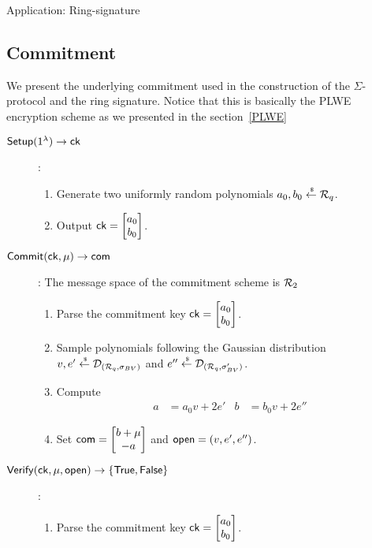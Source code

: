 \begin{section}{Application: Ring-signature}
  \subsection{Commitment}
  We present the underlying commitment used in the construction of the $\Sigma$-protocol
  and the ring signature.
  Notice that this is basically the PLWE encryption scheme as we presented in the section~\ref{PLWE}
  \begin{description}
    \item [${\mathsf{Setup}}(1^\lambda) \to \mathsf{ck}$]:
    \begin{enumerate}
      \item Generate two uniformly random polynomials $a_0, b_0 \stackrel{{\scriptscriptstyle \mkern4mu \$}}{\gets} {\mathcal{R}}_q$.
      \item Output $\mathsf{ck} = \begin{bmatrix} a_0 \\ b_0 \end{bmatrix}$.
    \end{enumerate}
    \item [${\mathsf{Commit}}(\mathsf{ck}, \mu) \to \mathsf{com}$]: The message space of the commitment scheme is ${\mathcal{R}}_2$
    \begin{enumerate}
      \item Parse the commitment key $\mathsf{ck} = \begin{bmatrix} a_0 \\ b_0 \end{bmatrix}$.
      \item Sample polynomials following the Gaussian distribution
      $v,e' \stackrel{{\scriptscriptstyle \mkern4mu \$}}{\gets} \mathcal{D}_{({\mathcal{R}}_q, \sigma_{BV})}$ and $e'' \stackrel{{\scriptscriptstyle \mkern4mu \$}}{\gets} \mathcal{D}_{({\mathcal{R}}_q, \sigma'_{BV})}$.
      \item Compute
      \begin{align*}
        a &= a_0 v + 2e' & b &= b_0v +2 e''
      \end{align*}
      \item Set $\mathsf{com} = \begin{bmatrix}  b+ \mu \\  -a \end{bmatrix}$ and $\mathsf{open} = (v, e', e'')$.
    \end{enumerate}
    \item [${\mathsf{Verify}}(\mathsf{ck}, \mu, \mathsf{open}) \to \{\mathsf{True}, \mathsf{False}\}$]:
    \begin{enumerate}
      \item Parse the commitment key $\mathsf{ck} = \begin{bmatrix} a_0 \\ b_0 \end{bmatrix}$.

\end{enumerate}
\end{description}
\end{section}
